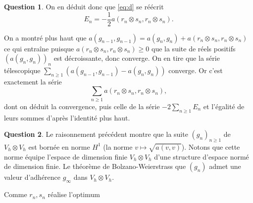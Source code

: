 \documentclass[11pt]{article}
\theoremstyle{definition}
\newtheorem{ques}{Question}
\begin{document}
\begin{ques}
On en déduit donc que \eqref{eq:d} se réécrit
\[
\boxed{E_n = -\frac 12a(r_n\otimes s_n,r_n \otimes s_n).}
\]

On a montré plus haut que $a(g_{n-1},g_{n-1}) = a(g_n,g_n) + a(r_n\otimes s_n,r_n\otimes s_n)$ ce qui entraîne puisque $a(r_n\otimes s_n,r_n\otimes s_n)\geq 0$ que la suite de réels positifs $\left(a(g_n,g_n)\right)_n$ est décroissante, donc converge. On en tire que la série télescopique
\(
\sum_{n\geq 1} \left(a(g_{n-1},g_{n-1}) - a(g_n,g_n) \right)
\)
converge. Or c'est exactement la série
\[
\sum_{n\geq 1} a(r_n\otimes s_n,r_n\otimes s_n),
\]
dont on déduit la convergence, puis celle de la série $-2\sum_{n\geq 1}E_n$ et l'égalité de leurs sommes d'après l'identité plus haut.
\end{ques}

\begin{ques}
Le raisonnement précédent montre que la suite $(g_n)_{n\geq 1}$ de $V_h\otimes V_h$ est bornée en norme $H^1$ (la norme $v\longmapsto \sqrt{a(v,v)}$). Notons que cette norme équipe l'espace de dimension finie $V_h\otimes V_h$ d'une structure d'espace normé de dimension finie. Le théorème de Bolzano-Weierstrass que $(g_n)$ admet une valeur d'adhérence $g_\infty$ dans $V_h\otimes V_h$.


Comme $r_n,s_n$ réalise l'optimum 
\end{ques}
\end{document}
